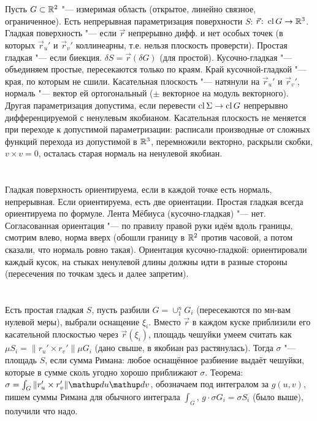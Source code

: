 \section{} %
Пусть $G \subset \mathbb{R}^2$ "--- измеримая область (открытое, линейно связное, ограниченное).
Есть непрерывная параметризация поверхности $S$: $\vec r \colon \operatorname{cl} G \to \mathbb{R}^3$.
Гладкая поверхность "--- если $\vec r$ непрерывно дифф. и нет особых точек (в которых
$\vec r_u'$ и $\vec r_v'$ коллинеарны, т.е. нельзя плоскость проверсти).
Простая гладкая "--- если биекция.
$\delta S = \vec r(\delta G)$ (для простой).
Кусочно-гладкая "--- объединяем простые, пересекаются только по краям.
Край кусочной-гладкой "--- края, по которым не сшили.
Касательная плоскость "--- натянули на $\vec r_u'$ и $\vec r_v'$, нормаль "--- вектор ей ортогональный
($\pm$ векторное на модуль векторного).
Другая параметризация допустима, если перевести $\operatorname{cl} \Sigma \to \operatorname{cl} G$ непрерывно дифференцируемой
с ненулевым якобианом.
Касательная плоскость не меняется при переходе к допустимой параметризации: расписали производные от сложных
функций перехода из допустимой в $\mathbb{R}^3$, перемножили векторно, раскрыли скобки, $v \times v = 0$,
осталась старая нормаль на ненулевой якобиан.

\section{} %
Гладкая поверхность ориентируема, если в каждой точке есть нормаль, непрерывная.
Если ориентируема, есть две ориентации.
Простая гладкая всегда ориентируема по формуле.
Лента Мёбиуса (кусочно-гладкая) "--- нет.
Согласованная ориентация "--- по правилу правой руки идём вдоль границы, смотрим влево, норма вверх (обошли границу в $\mathbb{R}^2$ против часовой, а потом сказали, что нормаль ровно такая).
Ориентация кусочно-гладкой: ориентировали каждый кусок, на стыках ненулевой длины должны идти в разные стороны (пересечения по точкам здесь и далее запретим).

\section{} %
Есть простая гладкая $S$, пусть разбили $G=\cup_1^n G_i$ (пересекаются по мн-вам нулевой меры), выбрали оснащение $\xi_i$.
Вместо $\vec r$ в каждом куске приблизили его касательной плоскостью через $\vec r(\xi_i)$, площадь чешуйки умеем считать
как $\mu S_i = \|r_u' \times r_v'\| \mu G_i$ (дано свыше, в якобиан раз растянулась).
Тогда $\sigma$ "--- площадь $S$, если сумма Римана: любое оснащённое разбиение выдаёт чешуйки, которые в сумме сколь угодно хорошо приближают $\sigma$.
Теорема: $\sigma = \int_G \|r_u' \times r_v'\| \d u \d v$, обозначаем под интегралом за $g(u, v)$, пишем суммы Римана для обычного интеграла $\int_G$,
$g\cdot \sigma G_i = \sigma S_i$ (было выше), получили что надо.

